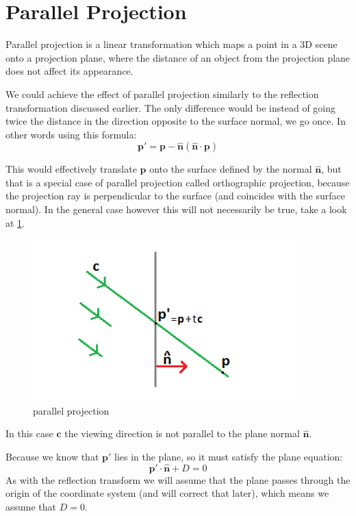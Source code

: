 \documentclass[]{report}   %
\begin{document}
\section{Parallel Projection}
Parallel projection is a linear transformation which maps a point in a 3D scene onto a projection plane, where the distance of an object from the projection plane does not affect its appearance.

We could achieve the effect of parallel projection similarly to the reflection transformation discussed earlier. The only difference would be instead of going twice the distance in the direction opposite to the surface normal,
we go once. In other words using this formula:
\[
	\mathbf{p\prime} = 
	\mathbf{p} - \mathbf{\hat{n}}(\mathbf{\hat{n}} \cdot \mathbf{p})
\]

This would effectively translate \(\mathbf{p}\) onto the surface defined by the normal \(\mathbf{\hat{n}}\), but that is a special case of parallel projection called orthographic projection, because the projection ray is perpendicular to the surface (and coincides with the surface normal). In the general case however this will not necessarily be true, take a look at \ref{fig:parproj}.
\begin{figure}[htb]
\centering
\includegraphics[width=0.9\textwidth]{projection-diagram}
\caption{parallel projection}
\label{fig:parproj}
\end{figure}
In this case \(\mathbf{c}\) the viewing direction is not parallel to the plane normal \(\mathbf{\hat{n}}\).

Because we know that \(\mathbf{p\prime}\) lies in the plane, so it must satisfy the plane equation:
\[
	\mathbf{p\prime} \cdot \mathbf{\hat{n}} + D = 0
\]
As with the reflection transform we will assume that the plane passes through the origin of the coordinate system (and will correct that later), which means we assume that \(D=0\).
\end{document}
